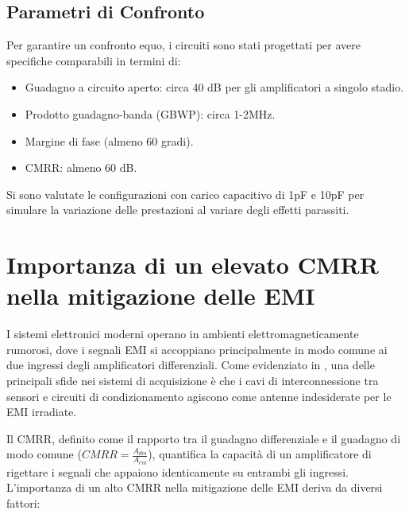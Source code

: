 
\subsection{Parametri di Confronto}

Per garantire un confronto equo, i circuiti sono stati progettati per avere specifiche comparabili in termini di:

\begin{itemize}
    \item Guadagno a circuito aperto: circa 40 dB per gli amplificatori a singolo stadio.
    \item Prodotto guadagno-banda (GBWP): circa 1-2MHz.
    \item Margine di fase (almeno 60 gradi).
    \item CMRR: almeno 60 dB.
\end{itemize}

Si sono valutate le configurazioni con carico capacitivo di 1pF e 10pF per simulare la variazione delle prestazioni al variare degli effetti parassiti.
\section{Importanza di un elevato CMRR nella mitigazione delle EMI}

I sistemi elettronici moderni operano in ambienti elettromagneticamente rumorosi, dove i segnali EMI si accoppiano principalmente in modo comune ai due ingressi degli amplificatori differenziali. Come evidenziato in \cite{finalprint}, una delle principali sfide nei sistemi di acquisizione è che i cavi di interconnessione tra sensori e circuiti di condizionamento agiscono come antenne indesiderate per le EMI irradiate.

Il CMRR, definito come il rapporto tra il guadagno differenziale e il guadagno di modo comune ($CMRR = \frac{A_{dm}}{A_{cm}}$), quantifica la capacità di un amplificatore di rigettare i segnali che appaiono identicamente su entrambi gli ingressi. L'importanza di un alto CMRR nella mitigazione delle EMI deriva da diversi fattori:

